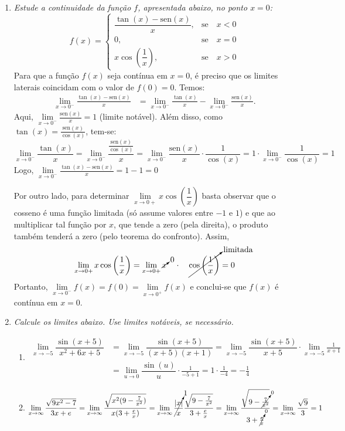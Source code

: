 \documentclass[12pt,a4paper]{article}
\begin{document}
\begin{enumerate}
\item \textit{Estude a continuidade da função $f$, apresentada abaixo, no ponto $x=0$:
\[f(x)=\left\{\begin{array}{ll}
\dfrac{\tan(x)-\text{sen}(x)}{x}, & \text{se}\quad x<0\\
0, & \text{se}\quad x=0 \\
x \cos\left(\dfrac{1}{x}\right), & \text{se}\quad x>0
\end{array}\right. \]
}
Para que a função $f(x)$ seja contínua em $x=0$, é preciso que os limites laterais coincidam com o valor de $f(0) = 0$. Temos:
\begin{align*}
  \lim\limits_{x \to 0^-}\frac{\tan(x)-\text{sen}(x)}{x}
& = \lim\limits_{x \to 0^-}\frac{\tan(x)}{x}
   -\lim\limits_{x \to 0^-}\frac{\text{sen}(x)}{x}.
\end{align*}
Aqui, $\lim\limits_{x \to 0^-}\frac{\text{sen}(x)}{x} = 1$ (limite notável). Além disso, como $\tan(x) = \frac{\text{sen}(x)}{\cos(x)}$, tem-se:
\[
    \lim\limits_{x \to 0^-}\frac{\tan(x)}{x}
= \lim\limits_{x \to 0^-}\frac{ \frac{\text{sen}(x)}{\cos(x)} }{x}
= \lim\limits_{x \to 0^-}\frac{\text{sen}(x)}{x}
                     \cdot \frac{1}{\cos(x)}
= 1 \cdot \lim\limits_{x \to 0^-} \frac{1}{\cos(x)}
= 1
\]
Logo, $\lim\limits_{x \to 0^-}\frac{\tan(x)-\text{sen}(x)}{x} = 1 - 1 = 0$

Por outro lado, para determinar $\lim\limits_{x \to 0+} x \cos\left(\dfrac{1}{x}\right)$ basta observar que o cosseno é uma função limitada (só assume valores entre $-1$ e $1$) e que ao multiplicar tal função por $x$, que tende a zero (pela direita), o produto também tenderá a zero (pelo teorema do confronto). Assim,
\[
 \lim\limits_{x \to 0+} x \cos\left(\dfrac{1}{x}\right)
= \lim\limits_{x \to 0+}
 \cancelto{0}{x}
 \quad \cdot \quad
 \cancelto{\text{limitada}}{\cos\left(\dfrac{1}{x}\right)}
= 0
\]
Portanto, $\lim\limits_{x \to 0^-} f(x) = f(0) = \lim\limits_{x \to 0^+} f(x)$ e conclui-se que $f(x)$ é contínua em $x=0$.

\item \textit{Calcule os limites abaixo. Use limites notáveis, se necessário.}
\begin{enumerate}
\item
\begin{align*}
  \lim\limits_{x\to -5 }\dfrac{\sin(x+5)}{x^2 + 6x + 5}
& = \lim\limits_{x\to -5 }\dfrac{\sin(x+5)}{(x+5)(x+1)}
  = \lim\limits_{x\to -5 } \dfrac{\sin(x+5)}{x+5}
  \cdot
  \lim\limits_{x\to -5 } \frac{1}{x+1} \\
& = \lim\limits_{u\to 0} \dfrac{\sin(u)}{u}
  \cdot
  \frac{1}{-5+1} = 1
  \cdot
  \frac{1}{-4} = -\frac{1}{4}
\end{align*}
\item
\[
  \lim\limits_{x\to \infty} \frac{\sqrt{9x^2-7}}{3x+e}
= \lim\limits_{x\to \infty} \frac{\sqrt{x^2(9-\frac{7}{x^2})}}{x(3 + \frac{e}{x})}
= \lim\limits_{x\to \infty} \cancelto{1}{\frac{|x|}{x}}\frac{\sqrt{9-\frac{7}{x^2}}}{3 + \frac{e}{x}}
= \lim\limits_{x\to \infty} \frac{\sqrt{9-\cancelto{0}{\frac{7}{x^2}}}}{3 + \cancelto{0}{\frac{e}{x}}}
= \lim\limits_{x\to \infty} \frac{\sqrt{9}}{3}
= 1
\]


\end{enumerate}
\end{enumerate}
\end{document}
